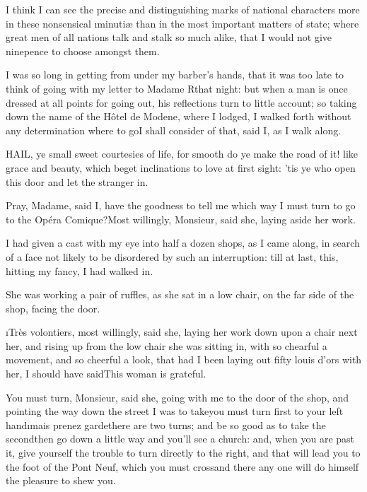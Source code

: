 \documentclass[twoside]{article}
\begin{document}
I think I can see the precise and distinguishing marks of national
characters more in these nonsensical \i{minutiæ} than in the most important
matters of state; where great men of all nations talk and stalk so much
alike, that I would not give ninepence to choose amongst them.

I was so long in getting from under my barber’s hands, that it was too
late to think of going with my letter to Madame R\astiii  that night: but when a
man is once dressed at all points for going out, his reflections turn to
little account; so taking down the name of the Hôtel de Modene, where I
lodged, I walked forth without any determination where to go\tsk I shall
consider of that, said I, as I walk along.






HAIL, ye small sweet courtesies of life, for smooth do ye make the road
of it! like grace and beauty, which beget inclinations to love at first
sight: ’tis ye who open this door and let the stranger in.

\tsk Pray, Madame, said I, have the goodness to tell me which way I must turn
to go to the Opéra Comique?\tsk Most willingly, Monsieur, said she, laying
aside her work.\tsk 

I had given a cast with my eye into half a dozen shops, as I came along,
in search of a face not likely to be disordered by such an interruption:
till at last, this, hitting my fancy, I had walked in.

She was working a pair of ruffles, as she sat in a low chair, on the far
side of the shop, facing the door.

\tsk \i{Très volontiers}, most willingly, said she, laying her work down upon a
chair next her, and rising up from the low chair she was sitting in, with
so chearful a movement, and so cheerful a look, that had I been laying
out fifty louis d’ors with her, I should have said\tsk \lqq This woman is
grateful.\rqq

You must turn, Monsieur, said she, going with me to the door of the shop,
and pointing the way down the street I was to take\tsk you must turn first
to your left hand\tsk \i{mais prenez garde}\tsk there are two turns; and be so
good as to take the second\tsk then go down a little way and you’ll see a
church: and, when you are past it, give yourself the trouble to turn
directly to the right, and that will lead you to the foot of the Pont
Neuf, which you must cross\tsk and there any one will do himself the pleasure
to shew you.\tsk 
\end{document}

